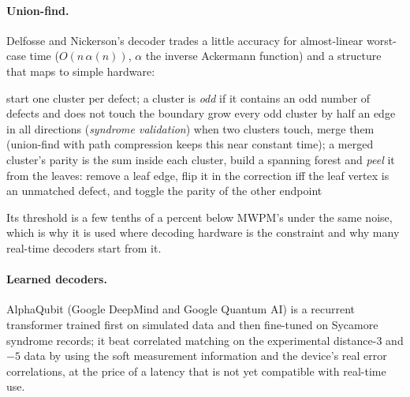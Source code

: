 \paragraph{Union-find.}\label{sec:unionfind} Delfosse and Nickerson's decoder \cite{delfosse-nickerson21} trades a little accuracy for almost-linear worst-case time ($O(n\,\alpha(n))$, $\alpha$ the inverse Ackermann function) and a structure that maps to simple hardware:

\begin{algorithm}[H]
\caption{Union-find decoder}\label{alg:uf}
\begin{algorithmic}[1]
\State start one cluster per defect; a cluster is \emph{odd} if it contains an odd number of defects and does not touch the boundary
  \State grow every odd cluster by half an edge in all directions (\emph{syndrome validation})
  \State when two clusters touch, merge them (union-find with path compression keeps this near constant time); a merged cluster's parity is the sum
\EndWhile
\State inside each cluster, build a spanning forest and \emph{peel} it from the leaves: remove a leaf edge, flip it in the correction iff the leaf vertex is an unmatched defect, and toggle the parity of the other endpoint
\end{algorithmic}
\end{algorithm}
Its threshold is a few tenths of a percent below MWPM's under the same noise, which is why it is used where decoding hardware is the constraint and why many real-time decoders start from it.

\paragraph{Learned decoders.} AlphaQubit \cite{alphaqubit24} (Google DeepMind and Google Quantum AI) is a recurrent transformer trained first on simulated data and then fine-tuned on Sycamore syndrome records; it beat correlated matching on the experimental distance-$3$ and $-5$ data by using the soft measurement information and the device's real error correlations, at the price of a latency that is not yet compatible with real-time use.

